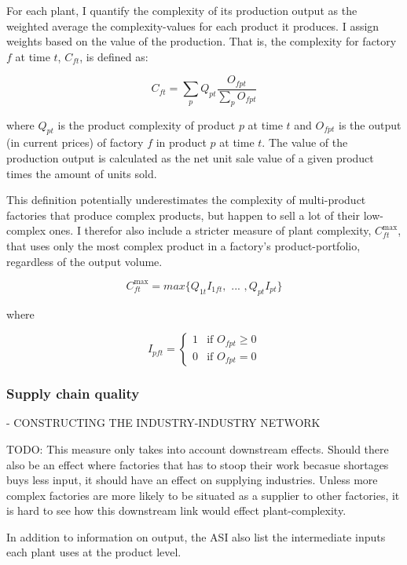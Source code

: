 \documentclass[11pt]{article}
\begin{document}
For each plant, I quantify the complexity of its production output as the weighted average the complexity-values for each product it produces. I assign weights based on the value of the production. That is, the complexity for factory \(f\) at time \(t\), \(C_{ft}\), is defined as:

$$
C_{ft} = \sum_p Q_{pt} \frac{O_{fpt}}{\sum_p O_{fpt}}
$$

where \(Q_{pt}\) is the product complexity of product \(p\) at time \(t\) and \(O_{fpt}\) is the output (in current prices) of factory \(f\) in product \(p\) at time \(t\). The value of the production output is calculated as the net unit sale value of a given product times the amount of units sold. 

This definition potentially underestimates the complexity of multi-product factories that produce complex products, but happen to sell a lot of their low-complex ones. I therefor also include a stricter measure of plant complexity, \(C^{\text{max}}_{ft}\), that uses only the most complex product in a factory's product-portfolio, regardless of the output volume.

$$
C^{\text{max}}_{ft} = max \{ Q_{1t} I_{1ft}, \text{ ... }, Q_{pt} I_{pt} \}
$$

where

\[
I_{pft} = \begin{cases}
 1 & \text{if } O_{fpt} \geq 0 \\
 0 & \text{if } O_{fpt} = 0
\end{cases}
\]

\subsubsection{Supply chain quality}%
\label{sub:supply_chain_quality}

- CONSTRUCTING THE INDUSTRY-INDUSTRY NETWORK

TODO: This measure only takes into account downstream effects. Should there also be an effect where factories that has to stoop their work becasue shortages buys less input, it should have an effect on supplying industries. Unless more complex factories are more likely to be situated as a supplier to other factories, it is hard to see how this downstream link would effect plant-complexity.

In addition to information on output, the ASI also list the intermediate inputs each plant uses at the product level.
\end{document}
